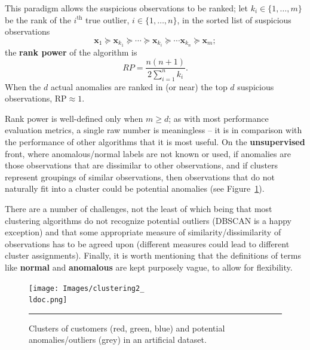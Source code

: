 \par This paradigm allows the suspicious observations to be ranked; let $k_i\in\{1,\ldots,m\}$ be the rank of the $i^{\text{th}}$ true outlier, $i\in \{1,\ldots,n\}$, in the sorted list of suspicious observations $$\mathbf{x}_1\succeq \mathbf{x}_{k_1}\succeq \cdots\succeq\mathbf{x}_{k_i}\succeq \cdots \mathbf{x}_{k_n}\succeq \mathbf{x}_m;$$ the \textbf{rank power} of the algorithm is $$RP=\frac{n(n+1)}{2\sum_{i=1}^nk_i}.$$ When the $d$ actual anomalies are ranked in (or near) the top $d$ suspicious observations, $\text{RP}\approx 1$. \par Rank power is well-defined only when $m\geq d$; as with most performance evaluation metrics, a single raw number is meaningless -- it is in comparison with the performance of other algorithms that it is most useful.  \newl On the \textbf{unsupervised} front, where anomalous/normal labels are not known or used, if anomalies are those observations that are dissimilar to other observations, and if clusters represent groupings of similar observations, then observations that do not naturally fit into a cluster could be potential anomalies (see Figure~\ref{fig:clust2}). \par There are a number of challenges, not the least of which being that most clustering algorithms do not recognize potential outliers (DBSCAN is a happy exception) and that some appropriate measure of similarity/dissimilarity of observations has to be agreed upon (different measures could lead to different cluster assignments). \newl Finally, it is worth mentioning that the definitions of terms like \textbf{normal} and \textbf{anomalous} are kept purposely vague, to allow for flexibility. 
\begin{figure}[t]
\centering
\texttt{[image: Images/clustering2\_\\ldoc.png]}
\caption{\small Clusters of customers (red, green, blue) and potential anomalies/outliers (grey) in an artificial dataset.}\hrule\label{fig:clust2}
\end{figure}

